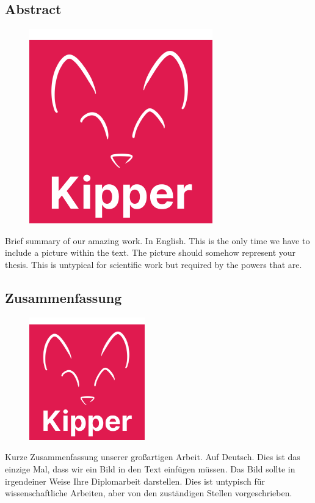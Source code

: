\begin{spacing}{1}
    \chapter*{Abstract}
\end{spacing}
\begin{figure}
    \begin{center}
      \includegraphics[height=0.4\textwidth]{pics/Kipper-Logo.png}
    \end{center}
\end{figure}

Brief summary of our amazing work. In English.
This is the only time we have to include a picture within the text.
The picture should somehow represent your thesis.
This is untypical for scientific work but required by the powers that are.

\lipsum[1-2]

\begin{spacing}{1}
	\chapter*{Zusammenfassung}
\end{spacing}
\begin{figure}
	\begin{center}
		\includegraphics[height=200px]{pics/Kipper-Logo.png}
	\end{center}
\end{figure}

Kurze Zusammenfassung unserer großartigen Arbeit. Auf Deutsch.
Dies ist das einzige Mal, dass wir ein Bild in den Text einfügen müssen.
Das Bild sollte in irgendeiner Weise Ihre Diplomarbeit darstellen.
Dies ist untypisch für wissenschaftliche Arbeiten, aber von den zuständigen Stellen vorgeschrieben.

\lipsum[1-2]

